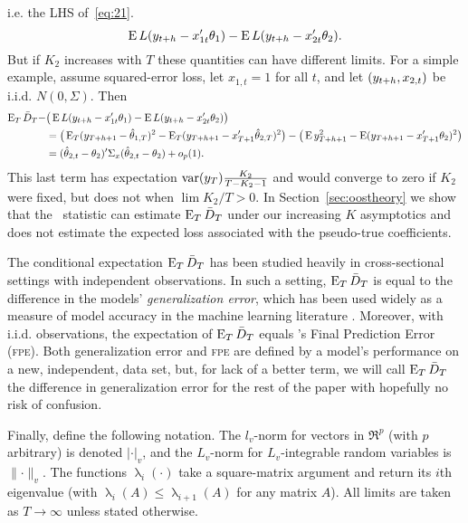 \documentclass[11pt]{article}
\DeclareMathOperator{\eigen}{\lambda}
\newcommand{\citepos}[1]{\citeauthor{#1}'s \citeyearpar{#1}}
\begin{document}
i.e. the LHS of~\eqref{eq:21}.
\begin{equation}\label{eq:22}
  \operatorname{E} L(y_{t+h} - x_{1t}'\theta_{1}) - \operatorname{E} L(y_{t+h} - x_{2t}'\theta_{2}).
\end{equation}
But if $K_2$ increases with $T$ these quantities can have different
limits. For a simple example, assume squared-error loss, let $x_{1,t}
= 1$ for all $t$, and let $(y_{t+h},x_{2,t})$ be i.i.d. $N(0,
\Sigma)$.  Then
\begin{align*}
  \operatorname{E}_T \bar{D}_{T} - & \big(\operatorname{E} L(y_{t+h} - x_{1t}'\theta_{1}) - \operatorname{E} L(y_{t+h} - x_{2t}'\theta_{2})\big) \\
  &= \big(\operatorname{E}_T (y_{T+h+1} - \hat\theta_{1,T})^2 - \operatorname{E}_T (y_{T+h+1} - x_{T+1}'\hat\theta_{2,T})^2\big) -
  \big(\operatorname{E} y_{T+h+1}^2 - \operatorname{E} (y_{T+h+1} - x_{T+1}'\theta_2)^2 \big)\\
  &= (\hat\theta_{2,t} - \theta_2)' \Sigma_x (\hat\theta_{2,t} - \theta_2) + o_p(1).
\end{align*}
This last term has expectation $\operatorname{var}(y_T) \frac{K_2}{T - K_2 - 1}$ and
would converge to zero if $K_2$ were fixed, but does not when $\lim
K_2 / T > 0$. In Section~\ref{sec:oostheory} we show that the \oost\
statistic can estimate $\operatorname{E}_T \bar{D}_{T}$ under our increasing $K$
asymptotics and does not estimate the expected loss associated with
the pseudo-true coefficients.

The conditional expectation $\operatorname{E}_T \bar{D}_{T}$ has been studied heavily in
cross-sectional settings with independent observations. In such a
setting, $\operatorname{E}_T \bar{D}_{T}$ is equal to the difference in the models'
\emph{generalization error}, which has been used widely as a measure
of model accuracy in the machine
learning literature \citep[see][for further discussion]{HTF:08}.
Moreover, with i.i.d. observations, the expectation of $\operatorname{E}_T \bar{D}_{T}$
equals \citepos{Aka:69} Final Prediction Error (\textsc{fpe}). Both
generalization error and \textsc{fpe} are defined by a model's
performance on a new, independent, data set, but, for lack of a better
term, we will call $\operatorname{E}_T \bar{D}_{T}$ the difference in generalization error
for the rest of the paper with hopefully no risk of confusion.

Finally, define the following notation.  The $l_v$-norm for vectors in
$\Re^p$ (with $p$ arbitrary) is denoted $\lvert \cdot \rvert_v$, and
the $L_v$-norm for $L_v$-integrable random variables is $\lVert \cdot
\rVert_v$.  The functions $\eigen_i(\cdot)$ take a square-matrix
argument and return its $i$th eigenvalue (with $\eigen_{i}(A) \leq
\eigen_{i+1}(A)$ for any matrix $A$).  All limits are taken as $T \to
\infty$ unless stated otherwise.
\end{document}
